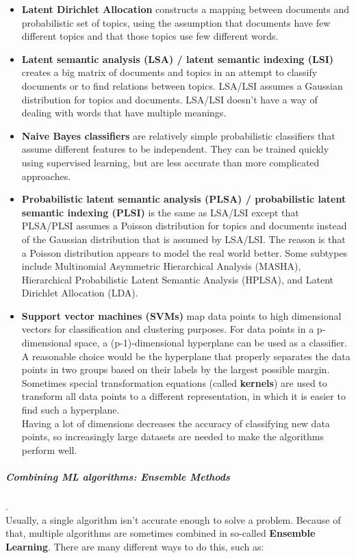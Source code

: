 \begin{itemize}
	\item \textbf{Latent Dirichlet Allocation}\cite{Blei03}
		constructs a mapping between documents and probabilistic set of topics, using the assumption that documents have few different topics and that those topics use few different words.
	\item \textbf{Latent semantic analysis (LSA) / latent semantic indexing (LSI)}
		creates a big matrix of documents and topics in an attempt to classify documents or to find relations between topics. LSA/LSI assumes a Gaussian distribution for topics and documents. LSA/LSI doesn't have a way of dealing with words that have multiple meanings.
	\item \textbf{Naive Bayes classifiers}
		are relatively simple probabilistic classifiers that assume different features to be independent. They can be trained quickly using supervised learning, but are less accurate than more complicated approaches.
	\item \textbf{Probabilistic latent semantic analysis (PLSA) / probabilistic latent semantic indexing (PLSI)}
		is the same as LSA/LSI except that PLSA/PLSI assumes a Poisson distribution for topics and documents instead of the Gaussian distribution that is assumed by LSA/LSI. The reason is that a Poisson distribution appears to model the real world better. Some subtypes include Multinomial Asymmetric Hierarchical Analysis (MASHA), Hierarchical Probabilistic Latent Semantic Analysis (HPLSA), and Latent Dirichlet Allocation (LDA).
	\item \textbf{Support vector machines (SVMs)}
		map data points to high dimensional vectors for classification and clustering purposes. For data points in a p-dimensional space, a (p-1)-dimensional hyperplane can be used as a classifier. A reasonable choice would be the hyperplane that properly separates the data points in two groups based on their labels by the largest possible margin. Sometimes special transformation equations (called \textbf{kernels}) are used to transform all data points to a different representation, in which it is easier to find such a hyperplane.\\
		Having a lot of dimensions decreases the accuracy of classifying new data points, so increasingly large datasets are needed to make the algorithms perform well.
\end{itemize}

\subparagraph{Combining ML algorithms: Ensemble Methods}
.\\
Usually, a single algorithm isn't accurate enough to solve a problem. Because of that, multiple algorithms are sometimes combined in so-called \textbf{Ensemble Learning}. There are many different ways to do this, such as:

